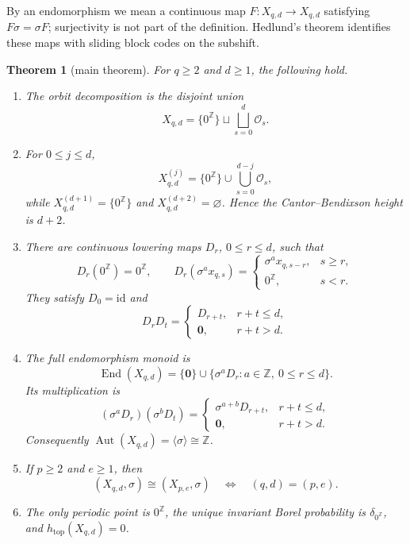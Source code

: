 \documentclass[11pt,a4paper]{amsart}
\newtheorem{theorem}{Theorem}[section]
\theoremstyle{definition}
\theoremstyle{remark}
\newcommand{\Z}{\mathbb Z}
\newcommand{\cO}{\mathcal O}
\newcommand{\End}{\operatorname{End}}
\newcommand{\Aut}{\operatorname{Aut}}
\newcommand{\htop}{h_{\mathrm{top}}}
\newcommand{\zz}{\mathbf 0}
\newcommand{\zero}{0^{\Z}}
\begin{document}
By an endomorphism we mean a continuous map $F:X_{q,d}\to X_{q,d}$ satisfying
$F\sigma=\sigma F$; surjectivity is not part of the definition.  Hedlund's
theorem \cite{Hedlund1969} identifies these maps with sliding block codes on
the subshift.

\begin{theorem}[main theorem]\label{thm:main}
For $q\geq2$ and $d\geq1$, the following hold.
\begin{enumerate}
\item The orbit decomposition is the disjoint union
\begin{equation}\label{eq:orbit-decomposition}
 X_{q,d}=\{\zero\}\sqcup\bigsqcup_{s=0}^{d}\cO_s.
\end{equation}
\item For $0\leq j\leq d$,
\begin{equation}\label{eq:derivatives}
 X_{q,d}^{(j)}=\{\zero\}\cup
 \bigcup_{s=0}^{d-j}\cO_s,
\end{equation}
while $X_{q,d}^{(d+1)}=\{\zero\}$ and
$X_{q,d}^{(d+2)}=\varnothing$.  Hence the Cantor--Bendixson height is
$d+2$.
\item There are continuous lowering maps $D_r$, $0\leq r\leq d$, such that
\begin{equation}\label{eq:lowering-definition}
 D_r(\zero)=\zero,
 \qquad
 D_r(\sigma^a x_{q,s})=
 \begin{cases}
 \sigma^a x_{q,s-r},&s\geq r,\\
 \zero,&s<r.
 \end{cases}
\end{equation}
They satisfy $D_0=\mathrm{id}$ and
\begin{equation}\label{eq:lowering-composition}
 D_rD_t=
 \begin{cases}
 D_{r+t},&r+t\leq d,\\
 \zz,&r+t>d.
 \end{cases}
\end{equation}
\item The full endomorphism monoid is
\begin{equation}\label{eq:end-monoid}
 \End(X_{q,d})=\{\zz\}\cup
 \{\sigma^aD_r:a\in\Z,\ 0\leq r\leq d\}.
\end{equation}
Its multiplication is
\begin{equation}\label{eq:end-multiplication}
 (\sigma^aD_r)(\sigma^bD_t)=
 \begin{cases}
 \sigma^{a+b}D_{r+t},&r+t\leq d,\\
 \zz,&r+t>d.
 \end{cases}
\end{equation}
Consequently $\Aut(X_{q,d})=\langle\sigma\rangle\cong\Z$.
\item If $p\geq2$ and $e\geq1$, then
\begin{equation}\label{eq:conjugacy-rigidity}
 (X_{q,d},\sigma)\cong(X_{p,e},\sigma)
 \quad\Longleftrightarrow\quad (q,d)=(p,e).
\end{equation}
\item The only periodic point is $\zero$, the unique invariant Borel
probability is $\delta_{\zero}$, and $\htop(X_{q,d})=0$.
\end{enumerate}
\end{theorem}
\end{document}

